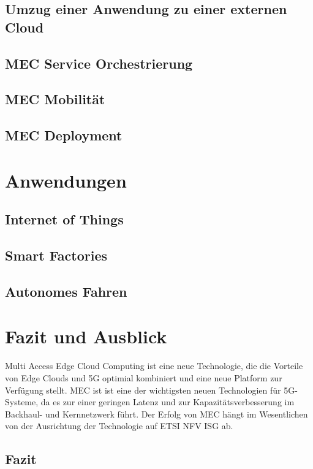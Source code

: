 \documentclass[runningheads]{llncs}
\numberwithin{figure}{section}
\begin{document}
\subsection{Umzug einer Anwendung zu einer externen Cloud}

\subsection{MEC Service Orchestrierung}
\label{subsec:MEC Service Orchestrierung}
\subsection{MEC Mobilität}
\label{subsec:MEC Mobilität}
\subsection{MEC Deployment}
\label{subsec:MEC Deployment}


\section{Anwendungen}
\label{sec:Anwendungen}
\subsection{Internet of Things}
\label{subsec:Internet of Things}
\subsection{Smart Factories}
\label{subsec:Smart Factory}
\subsection{Autonomes Fahren}
\label{subsec:Autonomes Fahren}
\section{Fazit und Ausblick}
Multi Access Edge Cloud Computing ist eine neue Technologie, die die Vorteile von
Edge Clouds und 5G optimial kombiniert und eine neue Platform zur Verfügung stellt.
MEC ist ist eine der wichtigsten neuen Technologien für 5G-Systeme, 
da es zur einer geringen Latenz und zur Kapazitätsverbesserung im Backhaul- und Kernnetzwerk führt. 
Der Erfolg von MEC hängt im Wesentlichen von der Ausrichtung der Technologie auf ETSI NFV ISG ab.
\subsection{Fazit}
\end{document}
